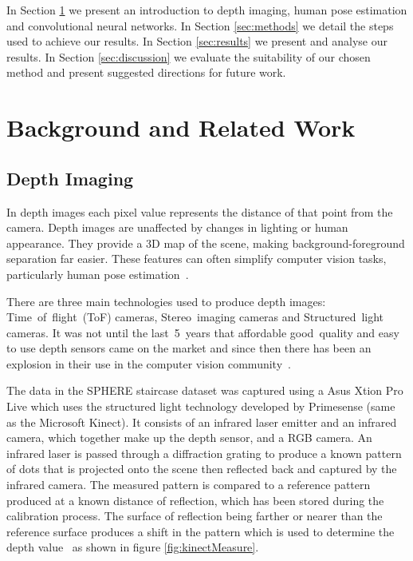 \documentclass[11pt]{article} %
\begin{document}
In Section \ref{sec:bg} we present an introduction to depth imaging, human pose estimation and convolutional neural networks. In Section \ref{sec:methods} we detail the steps used to achieve our results. In Section \ref{sec:results} we present and analyse our results. In Section \ref{sec:discussion} we evaluate the suitability of our chosen method and present suggested directions for future work.






\section{Background and Related Work}
\label{sec:bg}
\subsection{Depth Imaging}
\label{sec:Depth}


In depth images each pixel value represents the distance of that point from the camera. Depth images are unaffected by changes in lighting or human appearance. They provide a 3D map of the scene, making background-foreground separation far easier. These features can often simplify computer vision tasks, particularly human pose estimation~\cite{Chen2013}.

There are three main technologies used to produce depth images: Time~of~flight~(ToF) cameras, Stereo~imaging cameras and Structured~light cameras. It was not until the last~5~years that affordable good~quality and easy to use depth sensors came on the market and since then there has been an explosion in their use in the computer vision community~\cite{Han2013}.

The data in the SPHERE staircase dataset was captured using a Asus Xtion Pro Live which uses the structured light technology developed by Primesense (same as the Microsoft Kinect). It consists of an infrared laser emitter and an infrared camera, which together make up the depth sensor, and a RGB camera. An infrared laser is passed through a diffraction grating to produce a known pattern of dots that is projected onto the scene then reflected back and captured by the infrared camera. The measured pattern is compared to a reference pattern produced at a known distance of reflection, which has been stored during the calibration process. The surface of reflection being farther or nearer than the reference surface produces a shift in the pattern which is used to determine the depth value~\cite{Zhang2012a,Khoshelham2012a} as shown in figure \ref{fig:kinectMeasure}.
\end{document}

